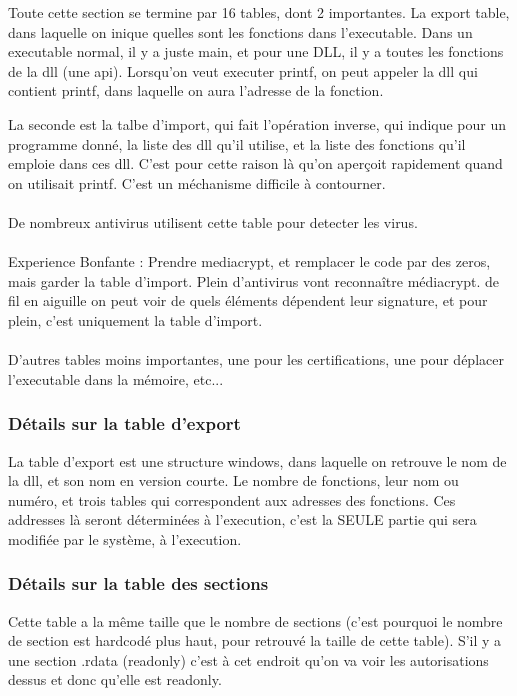\documentclass[a4paper,10pt]{article}
\begin{document}
Toute cette section se termine par 16 tables, dont 2 importantes.
La export table, dans laquelle on inique quelles sont les fonctions dans l'executable. Dans un executable normal, il y a juste main, et pour une DLL, il y a toutes les fonctions de la dll (une api). Lorsqu'on veut executer printf, on peut appeler la dll qui contient printf, dans laquelle on aura l'adresse de la fonction.

La seconde est la talbe d'import, qui fait l'opération inverse, qui indique pour un programme donné, la liste des dll qu'il utilise, et la liste des fonctions qu'il emploie dans ces dll. C'est pour cette raison là qu'on aperçoit rapidement quand on utilisait printf. C'est un méchanisme difficile à contourner.

\paragraph*{}
De nombreux antivirus utilisent cette table pour detecter les virus.

\paragraph*{}
Experience Bonfante : Prendre mediacrypt, et remplacer le code par des zeros, mais garder la table d'import. Plein d'antivirus vont reconnaître médiacrypt. de fil en aiguille on peut voir de quels éléments dépendent leur signature, et pour plein, c'est uniquement la table d'import.

\paragraph*{}
D'autres tables moins importantes, une pour les certifications, une pour déplacer l'executable dans la mémoire, etc...

\subsubsection{Détails sur la table d'export}
La table d'export est une structure windows, dans laquelle on retrouve le nom de la dll, et son nom en version courte. Le nombre de fonctions, leur nom ou numéro, et trois tables qui correspondent aux adresses des fonctions. Ces addresses là seront déterminées à l'execution, c'est la SEULE partie qui sera modifiée par le système, à l'execution.

\subsubsection{Détails sur la table des sections}
Cette table a la même taille que le nombre de sections (c'est pourquoi le nombre de section est hardcodé plus haut, pour retrouvé la taille de cette table). S'il y a une section .rdata (readonly) c'est à cet endroit qu'on va voir les autorisations dessus et donc qu'elle est readonly.
\end{document}
